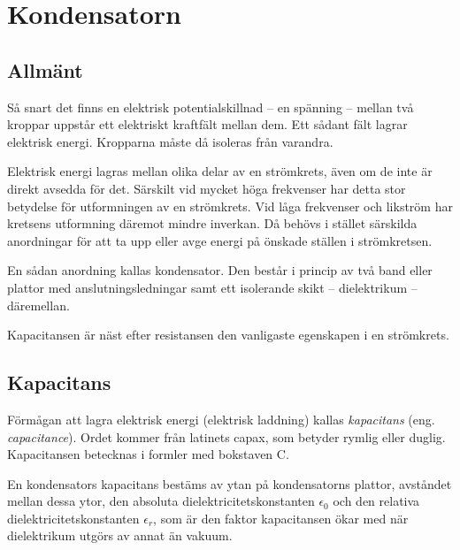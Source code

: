 \section{Kondensatorn}

\subsection{Allmänt}
\label{kondensator_allmänt}

Så snart det finns en elektrisk potentialskillnad -- en spänning -- mellan två
kroppar uppstår ett elektriskt kraftfält mellan dem.
Ett sådant fält lagrar elektrisk energi.
Kropparna måste då isoleras från varandra.

Elektrisk energi lagras mellan olika delar av en strömkrets, även om de inte är
direkt avsedda för det.
Särskilt vid mycket höga frekvenser har detta stor betydelse för utformningen av
en strömkrets.
Vid låga frekvenser och likström har kretsens utformning däremot mindre
inverkan.
Då behövs i stället särskilda anordningar för att ta upp eller avge energi på
önskade ställen i strömkretsen.

En sådan anordning kallas kondensator. Den består i princip av två band eller
plattor med anslutningsledningar samt ett isolerande skikt -- dielektrikum --
däremellan.

Kapacitansen är näst efter resistansen den vanligaste egenskapen i en
strömkrets.

\subsection{Kapacitans}

Förmågan att lagra elektrisk energi (elektrisk laddning) kallas
\emph{kapacitans} (eng. \emph{capacitance}).
Ordet kommer från latinets capax, som betyder rymlig eller duglig.
Kapacitansen betecknas i formler med bokstaven C.

En kondensators kapacitans bestäms av ytan på kondensatorns plattor,
avståndet mellan dessa ytor, den absoluta dielektricitetskonstanten
\(\epsilon_0\) och den relativa dielektricitetskonstanten \(\epsilon_r\), som är
den faktor kapacitansen ökar med när dielektrikum utgörs av annat än vakuum.

